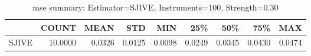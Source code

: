\begin{table}[ht]
\centering
\caption{mse summary: Estimator=SJIVE, Instruments=100, Strength=0.30}
\begin{tabular}{lrrrrrrrr}
\toprule
 & COUNT & MEAN & STD & MIN & 25\% & 50\% & 75\% & MAX \\
\midrule
SJIVE & 10.0000 & 0.0326 & 0.0125 & 0.0098 & 0.0249 & 0.0345 & 0.0430 & 0.0474 \\
\bottomrule
\end{tabular}
\end{table}
